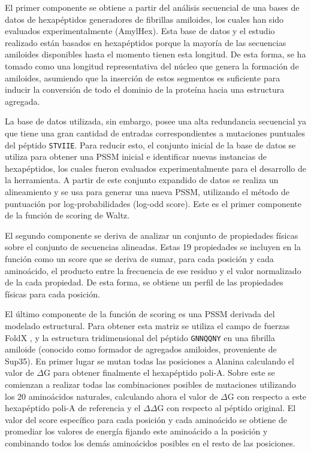 El primer componente se obtiene a partir del análisis secuencial de una bases de datos de hexapéptidos generadores de fibrillas amiloides, los cuales han sido evaluados experimentalmente (AmylHex).
Esta base de datos y el estudio realizado están basados en hexapéptidos porque la mayoría de las secuencias amiloides disponibles hasta el momento tienen esta longitud.
De esta forma, se ha tomado como una longitud representativa del núcleo que genera la formación de amiloides, asumiendo que
la inserción de estos segmentos es suficiente para inducir la conversión de todo el dominio de la proteína hacia una estructura agregada. 

La base de datos utilizada, sin embargo, posee una alta redundancia secuencial ya que tiene una gran cantidad de entradas correspondientes a mutaciones puntuales del péptido \texttt{STVIIE}.
Para reducir esto, el conjunto inicial de la base de datos se utiliza para obtener una PSSM inicial e identificar nuevas instancias de hexapéptidos, los cuales fueron evaluados experimentalmente para el desarrollo de la herramienta.
A partir de este conjunto expandido de datos se realiza un alineamiento y se usa para generar una nueva PSSM, utilizando el método de puntuación por log-probabilidades (log-odd score).
Este es el primer componente de la función de scoring de Waltz.

El segundo componente se deriva de analizar un conjunto de propiedades físicas sobre el conjunto de secuencias alineadas.
Estas 19 propiedades se incluyen en la función como un score que se deriva de sumar, para cada posición y cada aminoácido, el producto entre la frecuencia de ese residuo
y el valor normalizado de la cada propiedad. De esta forma, se obtiene un perfil de las propiedades físicas para cada posición.


El último componente de la función de scoring es una PSSM derivada del modelado estructural. 
Para obtener esta matriz se utiliza el campo de fuerzas FoldX \cite{schymkowitz2005foldx}, y la estructura tridimensional del péptido \texttt{GNNQQNY} en una fibrilla amiloide (conocido como formador de agregados amiloides, proveniente de Sup35).
En primer lugar se mutan todas las posiciones a Alanina calculando el valor de $\Delta$G para obtener finalmente el hexapéptido poli-A.
Sobre este se comienzan a realizar todas las combinaciones posibles de mutaciones utilizando los 20 aminoácidos naturales, calculando ahora el valor de $\Delta$G con respecto a este hexapéptido poli-A de referencia y 
el $\Delta\Delta$G con respecto al péptido original. 
El valor del score específico para cada posición y cada aminoácido se obtiene de promediar los valores de energía fijando este aminoácido a la posición y combinando todos los demás aminoácidos posibles en el resto de las posiciones.


